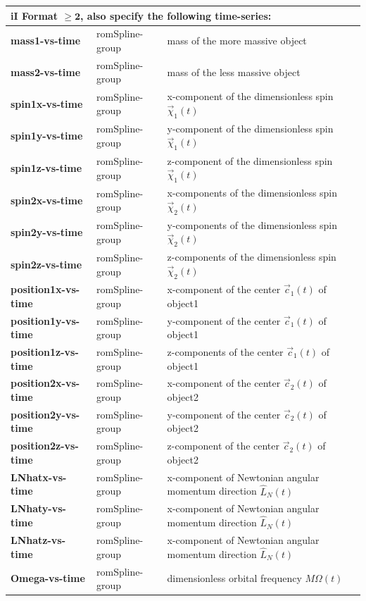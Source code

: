 \documentclass[11pt,tightenlines,article,amssymb,amsmath,amsfonts,superscriptaddress,nofootinbib]{revtex4}
\begin{document}
\begin{longtable}{|p{4cm}|p{2.5cm}|p{9.6cm}|}
\multicolumn{3}{|l|}{
  \rule[-.7em]{0pt}{2em}
       {\bf iI Format \boldmath $\mathbf{\ge 2}$, also specify the following time-series:}}\\ \hline
\textbf{mass1-vs-time} & romSpline-group & mass of the more massive object \\
\textbf{mass2-vs-time} & romSpline-group & mass of the less massive object \\
\textbf{spin1x-vs-time} & romSpline-group & x-component of the dimensionless spin $\vec\chi_1(t)$\\
\textbf{spin1y-vs-time} & romSpline-group & y-component of the dimensionless spin $\vec\chi_1(t)$\\
\textbf{spin1z-vs-time} & romSpline-group & z-component of the dimensionless spin $\vec\chi_1(t)$\\
\textbf{spin2x-vs-time} & romSpline-group & x-components of the dimensionless spin $\vec\chi_2(t)$ \\
\textbf{spin2y-vs-time} & romSpline-group & y-components of the dimensionless spin $\vec\chi_2(t)$\\
\textbf{spin2z-vs-time} & romSpline-group & z-components of the dimensionless spin $\vec\chi_2(t)$\\
\textbf{position1x-vs-time} & romSpline-group & x-component of the center $\vec c_1(t)$ of object1 \\
\textbf{position1y-vs-time} & romSpline-group & y-component of the center $\vec c_1(t)$ of object1\\
\textbf{position1z-vs-time} & romSpline-group & z-components of the center $\vec c_1(t)$ of object1\\
\textbf{position2x-vs-time} & romSpline-group & x-component of the center $\vec c_2(t)$ of object2\\
\textbf{position2y-vs-time} & romSpline-group & y-component of the center $\vec c_2(t)$ of object2\\
\textbf{position2z-vs-time} & romSpline-group & z-component of the center $\vec c_2(t)$ of object2\\
\textbf{LNhatx-vs-time} & romSpline-group & x-component of Newtonian angular momentum direction $\hat L_N(t)$\\
\textbf{LNhaty-vs-time} & romSpline-group & x-component of Newtonian angular momentum direction $\hat L_N(t)$\\
\textbf{LNhatz-vs-time} & romSpline-group & x-component of Newtonian angular momentum direction $\hat L_N(t)$\\
\textbf{Omega-vs-time} & romSpline-group & dimensionless orbital frequency $M\Omega(t)$ \\ 


\end{longtable}
\end{document}
